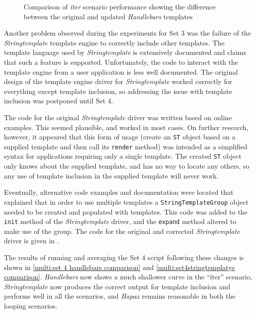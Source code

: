 \begin{figure}[!p]
\centering

\caption{\label{multi:set 4 handlebars comparison}Comparison of \emph{iter} scenario performance showing the difference between the original and updated \emph{Handlebars} templates}
\end{figure}

Another problem observed during the experiments for Set 3 was the failure of the \emph{Stringtemplate} \gls{template engine} to correctly include other templates. The \gls{template language} used by \emph{Stringtemplate} is extensively documented and claims that such a feature is supported. Unfortunately, the code to interact with the \gls{template engine} from a user application is less well documented. The original design of the \gls{template engine} driver for \emph{Stringtemplate} worked correctly for everything except template inclusion, so addressing the issue with template inclusion was postponed until Set 4.

The code for the original \emph{Stringtemplate} driver was written based on online examples. This seemed plausible, and worked in most cases. On further research, however, it appeared that this form of usage (create an \verb!ST! object based on a supplied template and then call its \verb!render! method) was intended as a simplified syntax for applications requiring only a single template. The created \verb!ST! object only knows about the supplied template, and has no way to locate any others, so any use of template inclusion in the supplied template will never work.

Eventually, alternative code examples and documentation were located that explained that in order to use multiple templates a \verb!StringTemplateGroup! object needed to be created and populated with templates. This code was added to the \verb!init! method of the \emph{Stringtemplate} driver, and the \verb!expand! method altered to make use of the group. The code for the original and corrected \emph{Stringtemplate} driver is given in .

The results of running and averaging the Set 4 script following these changes is shown in \autoref{multi:set 4 handlebars comparison} and \autoref{multi:set4stringtemplatye comparison}. \emph{Handlebars} now shows a much shallower curve in the \enquote{iter} scenario, \emph{Stringtemplate} now produces the correct output for template inclusion and performs well in all the scenarios, and \emph{Hapax} remains reasonable in both the looping scenarios.

